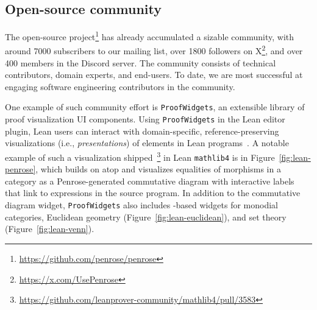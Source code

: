 \subsection{Open-source community} 

The \Penrose open-source project\footnote{\url{https://github.com/penrose/penrose}} has already accumulated a sizable community, with around 7000 subscribers to our mailing list, over 1800 followers on X\footnote{\url{https://x.com/UsePenrose}}, and over 400 members in the \Penrose Discord server. The community consists of technical contributors, domain experts, and end-users. To date, we are most successful at engaging software engineering contributors in the community. 

One example of such community effort is \texttt{ProofWidgets}, an extensible library of proof visualization UI components. Using \texttt{ProofWidgets} in the Lean editor plugin, Lean users can interact with domain-specific, reference-preserving visualizations (i.e., \textit{presentations}) of elements in Lean programs~\cite{nawrocki_extensible_2023}. A notable example of such a visualization shipped~\footnote{\url{https://github.com/leanprover-community/mathlib4/pull/3583}} in Lean \texttt{mathlib4} is in Figure~\ref{fig:lean-penrose}, which builds on atop \Penrose{} and visualizes equalities of morphisms in a category as a Penrose-generated commutative diagram with interactive labels that link to expressions in the source program. In addition to the commutative diagram widget, \texttt{ProofWidgets} also includes \Penrose{}-based widgets for monodial categories, Euclidean geometry (Figure~\ref{fig:lean-euclidean}), and set theory (Figure~\ref{fig:lean-venn}). 





